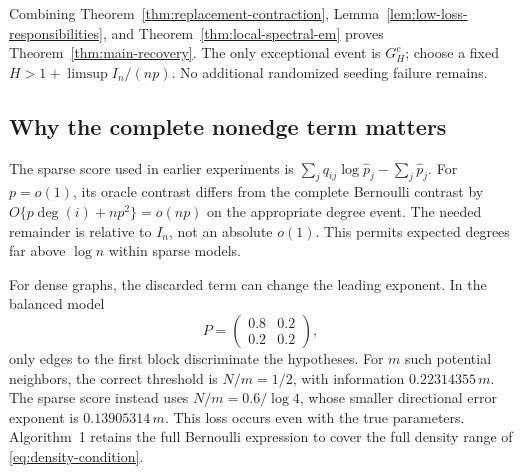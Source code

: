 Combining Theorem~\ref{thm:replacement-contraction}, Lemma~\ref{lem:low-loss-responsibilities}, and Theorem~\ref{thm:local-spectral-em} proves Theorem~\ref{thm:main-recovery}. The only exceptional event is $G_H^c$; choose a fixed $H>1+\limsup I_n/(np)$. No additional randomized seeding failure remains.

\subsection{Why the complete nonedge term matters}
The sparse score used in earlier experiments is
$\sum_jq_{ij}\log\widehat p_j-\sum_j\widehat p_j$.
For $p=o(1)$, its oracle contrast differs from the complete Bernoulli contrast by
$O\{p\deg(i)+np^2\}=o(np)$
on the appropriate degree event. The needed remainder is relative to $I_n$, not an absolute $o(1)$. This permits expected degrees far above $\log n$ within sparse models.

For dense graphs, the discarded term can change the leading exponent. In the balanced model
\[
 P=\begin{pmatrix}0.8&0.2\\0.2&0.2\end{pmatrix},
\]
only edges to the first block discriminate the hypotheses. For $m$ such potential neighbors, the correct threshold is $N/m=1/2$, with information $0.22314355\,m$. The sparse score instead uses $N/m=0.6/\log4$, whose smaller directional error exponent is $0.13905314\,m$. This loss occurs even with the true parameters. Algorithm~1 retains the full Bernoulli expression to cover the full density range of \eqref{eq:density-condition}.
